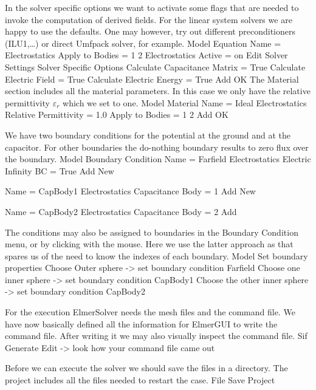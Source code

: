 In the solver specific options we want to activate some flags that are needed to invoke the 
computation of derived fields. 
For the linear system solvers we are happy to use the defaults. One may however, try out different
preconditioners (ILU1,\ldots) or direct Umfpack solver, for example.
\ttbegin
Model
  Equation
    Name = Electrostatics
    Apply to Bodies = 1 2
    Electrostatics
      Active = on
      Edit Solver Settings
        Solver Specific Options
          Calculate Capacitance Matrix = True
          Calculate Electric Field = True
          Calculate Electric Energy = True
    Add 
    OK
\ttend        
The Material section includes all the material parameters.
In this case we only have the relative permittivity $\varepsilon_r$ which we set to one.
\ttbegin
Model
  Material
    Name = Ideal
    Electrostatics
      Relative Permittivity = 1.0
    Apply to Bodies = 1 2
    Add
    OK
\ttend

We have two boundary conditions for the potential at the ground and at the capacitor. For other boundaries
the do-nothing boundary results to zero flux over the boundary.
\ttbegin
Model
  Boundary Condition
    Name = Farfield
    Electrostatics
      Electric Infinity BC = True
    Add
    New

    Name = CapBody1
    Electrostatics
      Capacitance Body = 1
    Add
    New

    Name = CapBody2
    Electrostatics
      Capacitance Body = 2
    Add
\ttend   

The conditions may also be assigned to boundaries in the Boundary Condition menu, or
by clicking with the mouse. Here we use the latter approach as that spares us of the 
need to know the indexes of each boundary.
\ttbegin
Model
  Set boundary properties
    Choose Outer sphere -> set boundary condition Farfield
    Choose one inner sphere -> set boundary condition CapBody1
    Choose the other inner sphere -> set boundary condition CapBody2
\ttend

For the execution 
ElmerSolver needs the mesh files and the command file. We have now basically defined
all the information for ElmerGUI to write the command file. After writing it we may also visually 
inspect the command file.
\ttbegin
Sif 
  Generate
  Edit -> look how your command file came out  
\ttend

Before we can execute the solver we should save the files in a directory. The project includes
all the files needed to restart the case.
\ttbegin
File 
  Save Project
\ttend

